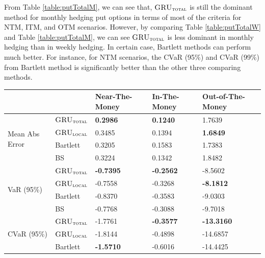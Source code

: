 \documentclass[letterpaper,12pt,titlepage,oneside,final]{book}
\numberwithin{equation}{section}
\theoremstyle{definition}
\newcommand{\modelT}{\textsc{GRU}_{\textsc{total}}}
\newcommand{\modelL}{\textsc{GRU}_{\textsc{local}}}
\begin{document}
From Table \ref{table:putTotalM}, we can see that, $\modelT$ is still the dominant  method for monthly hedging put options in terms of most of the criteria for NTM, ITM, and OTM scenarios.  However, by comparing Table \ref{table:putTotalW} and Table \ref{table:putTotalM}, we can see $\modelT$ is less dominant in monthly hedging than in weekly hedging. In certain case, Bartlett methods can perform much better. For instance, for NTM scenarios, the CVaR (95\%) and CVaR (99\%) from Bartlett method is significantly better than the other three comparing methods.
\begin{table}[htp!]
	\centering
	\begin{tabular}{ll|l|l|l|}
		\cline{3-5}
		&          & Near-The-Money   & In-The-Money     & Out-of-The-Money  \\ \hline
		\multicolumn{1}{|l|}{\multirow{4}{*}{Mean Abs Error}} & $\modelT$    & \textbf{0.2986}  & \textbf{0.1240}  & 1.7639            \\  
		\multicolumn{1}{|l|}{}                                & $\modelL$    & 0.3485           & 0.1394           & \textbf{1.6849}   \\  
		\multicolumn{1}{|l|}{}                                & Bartlett & 0.3205           & 0.1583           & 1.7383            \\  
		\multicolumn{1}{|l|}{}                                & BS       & 0.3224           & 0.1342           & 1.8482            \\ \hline
		\multicolumn{1}{|l|}{\multirow{4}{*}{VaR (95\%)}}     & $\modelT$    & \textbf{-0.7395} & \textbf{-0.2562} & -8.5602           \\  
		\multicolumn{1}{|l|}{}                                & $\modelL$    & -0.7558          & -0.3268          & \textbf{-8.1812}  \\  
		\multicolumn{1}{|l|}{}                                & Bartlett & -0.8370          & -0.3583          & -9.0303           \\  
		\multicolumn{1}{|l|}{}                                & BS       & -0.7768          & -0.3088          & -9.7018           \\ \hline
		\multicolumn{1}{|l|}{\multirow{4}{*}{CVaR (95\%)}}    & $\modelT$    & -1.7761          & \textbf{-0.3577} & \textbf{-13.3160} \\  
		\multicolumn{1}{|l|}{}                                & $\modelL$    & -1.8144          & -0.4898          & -14.6857          \\  
		\multicolumn{1}{|l|}{}                                & Bartlett & \textbf{-1.5710} & -0.6016          & -14.4425          \\  

\end{tabular}
\end{table}
\end{document}
